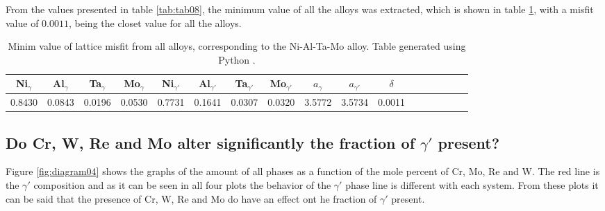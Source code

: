 From the values presented in table \ref{tab:tab08}, the minimum value of all the alloys was extracted, which is shown in table \ref{tab:tab09}, with a misfit value of $0.0011$, being the closet value for all the alloys.

\begin{table}[h]
  \begin{tabular}{rrrrrrrrrrrrrrrrr}
    \multicolumn{1}{c}{Ni$_\gamma$} & \multicolumn{1}{c}{Al$_\gamma$} & \multicolumn{1}{c}{Ta$_\gamma$} & \multicolumn{1}{c}{Mo$_\gamma$} & \multicolumn{1}{c}{Ni$_{\gamma'}$} & \multicolumn{1}{c}{Al$_{\gamma'}$} & \multicolumn{1}{c}{Ta$_{\gamma'}$} & \multicolumn{1}{c}{Mo$_{\gamma'}$} & \multicolumn{1}{c}{$a_\gamma$} & \multicolumn{1}{c}{$a_{\gamma'}$} & \multicolumn{1}{c}{$\delta$} \\ \hline \hline
    0.8430 & 0.0843 & 0.0196 & 0.0530 & 0.7731 & 0.1641 & 0.0307 & 0.0320 & 3.5772 & 3.5734 & 0.0011
  \end{tabular}
  \caption{Minim value of lattice misfit from all alloys, corresponding to the Ni-Al-Ta-Mo alloy. Table generated using Python \citep{mygit}.}
  \label{tab:tab09}
\end{table}

\newpage
\subsection{Do Cr, W, Re and Mo alter significantly the fraction of $\gamma'$ present?}

Figure \ref{fig:diagram04} shows the graphs of the amount of all phases as a function of the mole percent of Cr, Mo, Re and W. The red line is the $\gamma'$ composition and as it can be seen in all four plots the behavior of the $\gamma'$ phase line is different with each system. From these plots it can be said that the presence of Cr, W, Re and Mo do have an effect ont he fraction of $\gamma'$ present.



